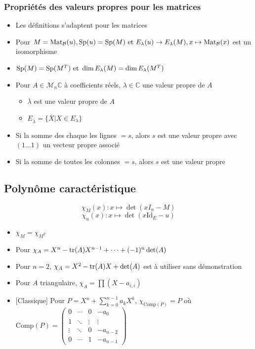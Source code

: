 \documentclass[openany]{book}
\begin{document}
\subsubsection{Propriétés des valeurs propres pour les matrices}
\begin{itemize}
    \item Les définitions s'adaptent pour les matrices
    \item Pour $M = \text{Mat}_{\mathcal{B}}(u), \text{Sp}(u) = \text{Sp}(M) \text{ et } E_{\lambda}(u) \rightarrow E_\lambda (M), x \mapsto \text{Mat}_{\mathcal{B}}(x)$ est un isomorphisme
    \item $\text{Sp}(M) = \text{Sp}(M^T) \text{ et } \dim E_\lambda(M) = \dim E_\lambda (M^T)$
    \item Pour $A \in \mathcal{M}_n{\mathbb{C}}$ à coefficients réels, $\lambda \in \mathbb{C}$ une valeur propre de $A$
    \begin{itemize}
        \item $\overline{\lambda}$ est une valeur propre de $A$
        \item $E_{\overline{\lambda}} = \{ \overline{X} | X \in E_{\lambda} \}$
    \end{itemize}
    \item Si la somme des chaque les lignes $ = s$, alors $s$ est une valeur propre avec $(1 \dots 1)$ un vecteur propre associé
    \item Si la somme de toutes les colonnes $ = s$, alors $s$ est une valeur propre
\end{itemize}

\subsection{Polynôme caractéristique}

\[ \chi_{M}(x): x \mapsto \det(x I_n - M) \]
\[ \chi_{u}(x): x \mapsto \det(x \text{Id}_E - u) \]

\begin{itemize}
    \item $\chi_M = \chi_{M^T}$
    \item Pour $\chi_A = X^n - \text{tr} (A) X^{n-1} + \dots + (-1)^n \det (A)$
    \item Pour $n = 2$, $\chi_A = X^2 - \text{tr} (A) X + \det (A)$ est à utiliser sans démonstration
    \item Pour $A$ triangulaire, $\chi_A = \prod (X-a_{i,i})$
    \item{} [Classique] Pour $P = X^n + \sum_{k=0}^{n-1} a_k X^k$, $\chi_{\text{Comp}(P)} = P$ où $\text{Comp}(P) = \begin{pmatrix}
        0      & \cdots & 0      & -a_0     \\
        1      & \ddots & \vdots & \vdots   \\
        \vdots & \ddots & 0      & -a_{n-2} \\
        0      & \cdots & 1      & -a_{n-1}
        \end{pmatrix}$
\end{itemize}
\end{document}
